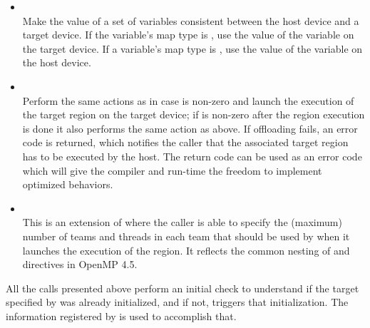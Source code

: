 \begin{itemize}
  \item {}\\

    Make the value of a set of variables consistent between the host device and a target device. If the variable's map type is \mfrom{}, use the value of the variable on the target device. If a variable’s map type is \mto{}, use the value of the variable on the host device.
    
  \item {}\\

    Perform the same actions as  in case  is non-zero and launch the execution of the target region on the target device; if  is non-zero after the region execution is done it also performs the same action as  above. If offloading fails, an error code is returned, which notifies the caller that the associated target region has to be executed by the host. The return code can be used as an error code which will give the compiler and run-time the freedom to implement optimized behaviors.

  \item {}\\

    This is an extension of  where the caller is able to specify the (maximum) number of teams and threads in each team that should be used by \libomptarget{} when it launches the execution of the region. It reflects the common nesting of \dtarget{} and \dteams{} directives in OpenMP 4.5. 

\end{itemize}

All the  calls presented above perform an initial check to understand if the target specified by  was already initialized, and if not, triggers that initialization. The information registered by  is used to accomplish that.

